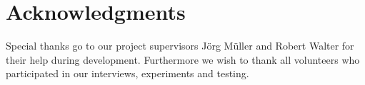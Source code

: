 \documentclass{chi-ext}
\begin{document}
\section{Acknowledgments}
Special thanks go to our project supervisors J\"org M\"uller and Robert Walter for their help during development. Furthermore we wish to thank all volunteers who participated in our interviews, experiments and testing.
%
%
\end{document}
